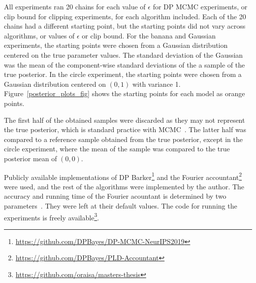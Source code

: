 \documentclass[english,twoside,openright]{HYgraduMLDS}
\begin{document}
All experiments ran 20 chains for each value
of \(\epsilon\) for DP MCMC experiments, or clip bound for clipping experiments,
for each algorithm included. Each of the
20 chains had a different starting point,
but the starting points did
not vary across algorithms, or values of \(\epsilon\) or clip bound.
For the banana and Gaussian experiments, the starting points were chosen
from a Gaussian distribution centered on the true parameter values. The standard
deviation of the Gaussian was the mean of the component-wise standard deviations
of the a sample of the true posterior. In the circle experiment, the starting points
were chosen from a Gaussian distribution centered on \((0, 1)\) with
variance 1. Figure~\ref{posterior_plots_fig} shows the starting points for
each model as orange points.

The first half of the obtained samples were discarded as they may not represent
the true posterior, which is standard practice with MCMC~\cite{BDA}. The
latter half was compared to a reference sample obtained from the true posterior,
except in the circle experiment, where the mean of the sample was compared to
the true posterior mean of \((0,0)\).

Publicly available implementations of DP
Barker\footnote{\url{https://github.com/DPBayes/DP-MCMC-NeurIPS2019}}
and the Fourier
accountant\footnote{\url{https://github.com/DPBayes/PLD-Accountant}} were
used, and the rest of the algorithms were implemented by the author.
The accuracy and running time of the Fourier acountant is
determined by two parameters~\cite{KJH20}. They were left at their default values.
The code for running the experiments is freely
available\footnote{\url{https://github.com/oraisa/masters-thesis}}.
\end{document}
